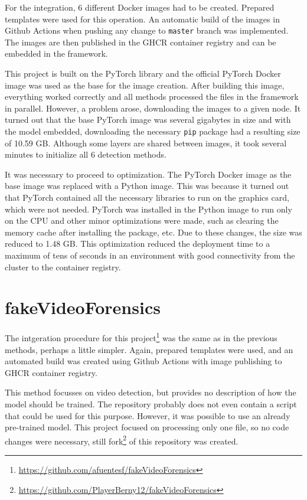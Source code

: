 For the integration, 6 different Docker images had to be created. Prepared templates were used for this operation. An automatic build of the images in Github Actions when pushing any change to \texttt{master} branch was implemented. The images are then published in the GHCR container registry and can be embedded in the framework.

This project is built on the PyTorch library and the official PyTorch Docker image was used as the base for the image creation. After building this image, everything worked correctly and all methods processed the files in the framework in parallel. However, a problem arose, downloading the images to a given node. It turned out that the base PyTorch image was several gigabytes in size and with the model embedded, downloading the necessary \texttt{pip} package had a resulting size of 10.59 GB. Although some layers are shared between images, it took several minutes to initialize all 6 detection methods.

It was necessary to proceed to optimization. The PyTorch Docker image as the base image was replaced with a Python image. This was because it turned out that PyTorch contained all the necessary libraries to run on the graphics card, which were not needed. PyTorch was installed in the Python image to run only on the CPU and other minor optimizations were made, such as clearing the memory cache after installing the package, etc. Due to these changes, the size was reduced to 1.48 GB. This optimization reduced the deployment time to a maximum of tens of seconds in an environment with good connectivity from the cluster to the container registry.

\section{fakeVideoForensics}

The intgeration procedure for this project\footnote{\url{https://github.com/afuentesf/fakeVideoForensics}} was the same as in the previous methods, perhaps a little simpler. Again, prepared templates were used, and an automated build was created using Github Actions with image publishing to GHCR container registry.

This method focusses on video detection, but provides no description of how the model should be trained. The repository probably does not even contain a script that could be used for this purpose. However, it was possible to use an already pre-trained model. This project focused on processing only one file, so no code changes were necessary, still fork\footnote{\url{https://github.com/PlayerBerny12/fakeVideoForensics}} of this repository was created.

